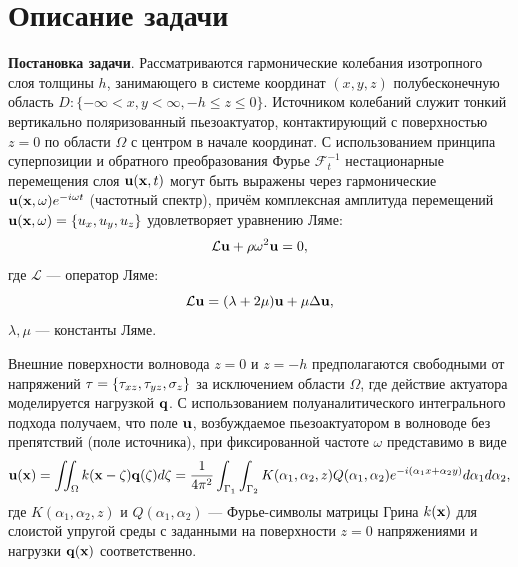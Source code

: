 \documentclass[a4paper, 12pt]{article}
\begin{document}
\section{Описание задачи}
{\bf Постановка задачи}. Рассматриваются гармонические колебания изотропного слоя толщины $h$,
занимающего в системе координат $(x, y, z)$ полубесконечную область
$D: \{ -\infty< x,y<\infty, -h \leq z \leq 0 \}$.
Источником колебаний служит тонкий вертикально поляризованный пьезоактуатор,
контактирующий с поверхностью $z = 0$ по области $\Omega$ с
центром в начале координат.
С использованием принципа суперпозиции и обратного преобразования Фурье
$\mathcal{F}_t^{-1}$ нестационарные перемещения слоя ${\bf u}({\bf x},t)$
могут быть выражены через гармонические ${\bf u}({\bf x},\omega)e^{-i \omega t}$ (частотный спектр),
причём комплексная амплитуда перемещений ${\bf u}({\bf x},\omega)=\{u_x,u_y,u_z \}$
удовлетворяет уравнению Ляме:
\begin{equation}
    \mathcal{L} {\bf u}+ \rho \omega^2 {\bf u}=0,
\end{equation}
где $\mathcal{L}$ --- оператор Ляме:
\begin{equation*}
    \mathcal{L} {\bf u}=(\lambda+2\mu){\bf u}+\mu \Delta {\bf u},
\end{equation*}
$\lambda, \mu$ --- константы Ляме.

Внешние поверхности волновода $z=0$ и $z=-h$ предполагаются свободными от напряжений
${\bf \tau}=\{\tau_{xz}, \tau_{yz}, \sigma_z \}$ за исключением области $\Omega$,
где действие актуатора моделируется нагрузкой ${\bf q}$. С использованием полуаналитического интегрального подхода получаем, что
поле ${\bf u}$, возбуждаемое пьезоактуатором в волноводе без препятствий (поле источника), при фиксированной частоте $\omega$ представимо в виде
\begin{equation}
    {\bf u}({\bf x})= \iint_{\Omega} k({\bf x}-{\bf \zeta}) {\bf q}({\bf \zeta}) d {\bf \zeta}=
    \dfrac{1}{4 \pi^2} \int_{\Gamma_1}\int_{\Gamma_2} K(\alpha_1,\alpha_2,z) Q(\alpha_1,\alpha_2) e^{-i (\alpha_1 x+ \alpha_2 y)} d\alpha_1 d\alpha_2,
\label{u1}
\end{equation}
где $K(\alpha_1,\alpha_2,z)$ и $Q(\alpha_1,\alpha_2)$ --- Фурье-символы матрицы Грина $k({\bf x})$
для слоистой упругой среды с заданными на поверхности $z=0$ напряжениями и нагрузки ${\bf q}({\bf x})$ соответственно.
\end{document}

